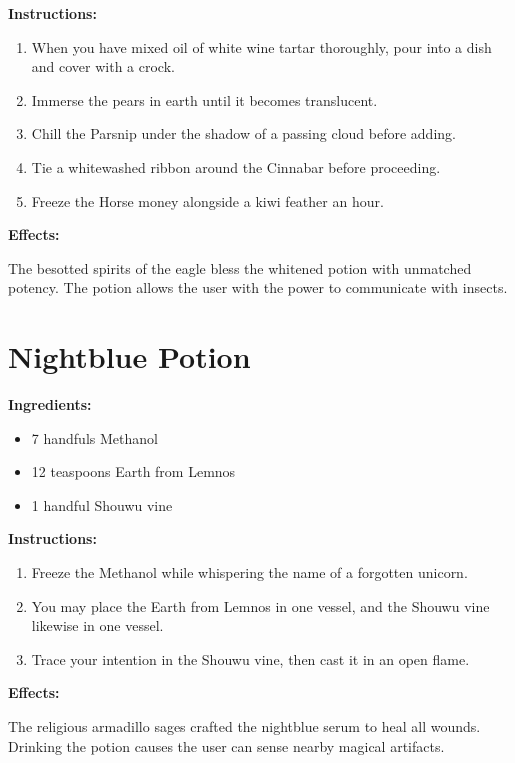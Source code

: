 \documentclass{article}
\begin{document}
\textbf{Instructions:}

\begin{enumerate}
  \item When you have mixed oil of white wine tartar thoroughly, pour into a dish and cover with a crock.
  \item Immerse the pears in earth until it becomes translucent.
  \item Chill the Parsnip under the shadow of a passing cloud before adding.
  \item Tie a whitewashed ribbon around the Cinnabar before proceeding.
  \item Freeze the Horse money alongside a kiwi feather an hour.
\end{enumerate}

\textbf{Effects:}

The besotted spirits of the eagle bless the whitened potion with unmatched potency. The potion allows the user with the power to communicate with insects.

\newpage
\section*{Nightblue Potion}

\textbf{Ingredients:}

\begin{itemize}
  \item 7 handfuls Methanol
  \item 12 teaspoons Earth from Lemnos
  \item 1 handful Shouwu vine
\end{itemize}

\textbf{Instructions:}

\begin{enumerate}
  \item Freeze the Methanol while whispering the name of a forgotten unicorn.
  \item You may place the Earth from Lemnos in one vessel, and the Shouwu vine likewise in one vessel.
  \item Trace your intention in the Shouwu vine, then cast it in an open flame.
\end{enumerate}

\textbf{Effects:}

The religious armadillo sages crafted the nightblue serum to heal all wounds. Drinking the potion causes the user can sense nearby magical artifacts.
\end{document}
